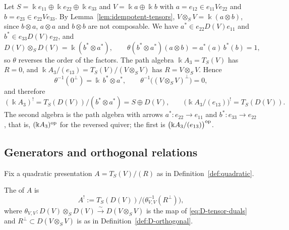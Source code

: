 \begin{example}\label{ex:A3-orthogonals}
Let $S=\Bbbk e_{11}\oplus\Bbbk e_{22}\oplus\Bbbk e_{33}$ and $V=\Bbbk a\oplus\Bbbk b$ with $a=e_{12}\in e_{11}Ve_{22}$ and $b=e_{23}\in e_{22}Ve_{33}$.
By Lemma~\ref{lem:idempotent-tensors}, $V\otimes_SV=\Bbbk(a\otimes b)$, since $b\otimes a$, $a\otimes a$ and $b\otimes b$ are not composable.
We have $a^*\in e_{22}D(V)e_{11}$ and $b^*\in e_{33}D(V)e_{22}$, and
\[
D(V)\otimes_SD(V)=\Bbbk(b^*\otimes a^*),\qquad
\theta(b^*\otimes a^*)(a\otimes b)=a^*(a)\,b^*(b)=1,
\]
so $\theta$ reverses the order of the factors.
The path algebra $\Bbbk A_3=T_S(V)$ has $R=0$, and $\Bbbk A_3/(e_{13})=T_S(V)/(V\otimes_SV)$ has $R=V\otimes_SV$.
Hence
\[
\theta^{-1}(0^\perp)=\Bbbk\,b^*\otimes a^*,\qquad
\theta^{-1}\bigl((V\otimes_SV)^\perp\bigr)=0,
\]
and therefore
\[
(\Bbbk A_3)^!=T_S(D(V))/(b^*\otimes a^*)=S\oplus D(V),\qquad
\bigl(\Bbbk A_3/(e_{13})\bigr)^!=T_S(D(V)).
\]
The second algebra is the path algebra with arrows $a^*:e_{22}\to e_{11}$ and $b^*:e_{33}\to e_{22}$, that is, $(\Bbbk A_3)^{\mathrm{op}}$ for the reversed quiver; the first is $\bigl(\Bbbk A_3/(e_{13})\bigr)^{\mathrm{op}}$.
\end{example}


\subsection{Generators and orthogonal relations}

Fix a quadratic presentation $A=T_S(V)/(R)$ as in Definition~\ref{def:quadratic}.


\begin{definition}\label{def:quadratic-duals}
The  of $A$ is
\begin{equation}\label{eq:quadratic-duals}
A^!:=T_S(D(V))/\bigl(\theta_{V,V}^{-1}(R^\perp)\bigr),
\end{equation}
where $\theta_{V,V}:D(V)\otimes_SD(V)\xrightarrow{\sim}D(V\otimes_SV)$ is the map of \eqref{eq:D-tensor-duals} and $R^\perp\subset D(V\otimes_SV)$ is as in Definition~\ref{def:D-orthogonal}.
\end{definition}

